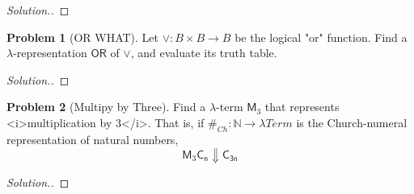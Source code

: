 \documentclass[11pt]{article}
\theoremstyle{theorem} %
\theoremstyle{definition} %
\newtheorem{problem}                    {{\color{BurntOrange}Problem}}
\theoremstyle{remark} %
\begin{document}
\begin{proof}
    [Solution.]
\end{proof}

\begin{problem}
    [OR WHAT]
    Let \(\vee \colon B \times B \to B\) be the logical "or" function. 
    Find a \(\lambda\)-representation \(\mathsf{OR}\) of \(\vee\), and evaluate its truth table.
\end{problem}

\begin{proof}
    [Solution.]
\end{proof}

\begin{problem}
    [Multipy by Three]
    Find a \(\lambda\)-term \(\mathsf{M}_3\) that represents <i>multiplication by \(3\)</i>. 
    That is, if \(\#_{Ch} \colon \mathbb N \to \lambda\mathit{Term}\) is the Church-numeral representation of natural numbers, \[
        \mathsf{M}_3\mathsf{C_n} \Downarrow \mathsf{C_{3n}}
    \]
\end{problem}

\begin{proof}
    [Solution.]
\end{proof}
\end{document}
